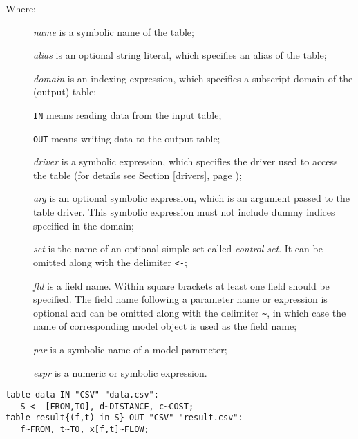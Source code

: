 \documentclass[10pt]{article}
\begin{document}
\begin{description}
\item[{\rm Where:}\hspace*{23pt}] {\it name} is a symbolic name of the
table;
\item[\hspace*{54pt}] {\it alias} is an optional string literal, which
specifies an alias of the table;
\item[\hspace*{54pt}] {\it domain} is an indexing expression, which
specifies a subscript domain of the (output) table;
\item[\hspace*{54pt}] {\tt IN} means reading data from the input table;
\item[\hspace*{54pt}] {\tt OUT} means writing data to the output table;
\item[\hspace*{54pt}] {\it driver} is a symbolic expression, which
specifies the driver used to access the table (for details see Section
\ref{drivers}, page \pageref{drivers});
\item[\hspace*{54pt}] {\it arg} is an optional symbolic expression,
which is an argument pass\-ed to the table driver. This symbolic
expression must not include dummy indices specified in the domain;
\item[\hspace*{54pt}] {\it set} is the name of an optional simple set
called {\it control set}. It can be omitted along with the delimiter
{\tt<-};
\item[\hspace*{54pt}] {\it fld} is a field name. Within square brackets
at least one field should be specified. The field name following
a parameter name or expression is optional and can be omitted along
with the delimiter {\tt\textasciitilde}, in which case the name of
corresponding model object is used as the field name;
\item[\hspace*{54pt}] {\it par} is a symbolic name of a model parameter;
\item[\hspace*{54pt}] {\it expr} is a numeric or symbolic expression.
\end{description}

\newpage


\begin{verbatim}
table data IN "CSV" "data.csv":
   S <- [FROM,TO], d~DISTANCE, c~COST;
table result{(f,t) in S} OUT "CSV" "result.csv":
   f~FROM, t~TO, x[f,t]~FLOW;
\end{verbatim}
\end{document}

